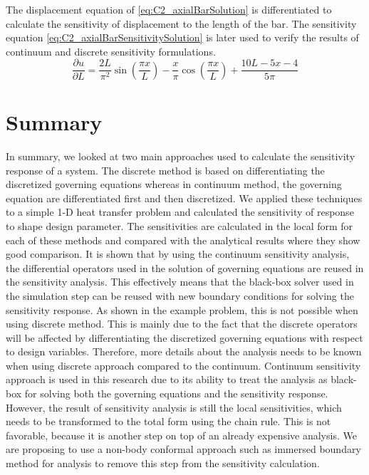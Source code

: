 %
The displacement equation of \eqref{eq:C2_axialBarSolution} is differentiated to calculate the sensitivity of displacement to the length of the bar. The sensitivity equation \eqref{eq:C2_axialBarSensitivitySolution} is later used to verify the results of continuum and discrete sensitivity formulations.
%
\begin{equation}\label{eq:C2_axialBarSensitivitySolution}
    \dfrac{\partial u}{\partial L} = 
    \dfrac{2L}{\pi^2} \sin \left( \frac{\pi x}{L} \right) - 
    \dfrac{x}{\pi} \cos \left( \frac{\pi x}{L} \right) + 
    \dfrac{10L - 5x - 4}{5 \pi}
\end{equation}
%


\section{Summary}
In summary, we looked at two main approaches used to calculate the sensitivity response of a system. The discrete method is based on differentiating the discretized governing equations whereas in continuum method, the governing equation are differentiated first and then discretized. We applied these techniques to a simple 1-D heat transfer problem and calculated the sensitivity of response to shape design parameter. The sensitivities are calculated in the local form for each of these methods and compared with the analytical results where they show good comparison. It is shown that by using the continuum sensitivity analysis, the differential operators used in the solution of governing equations are reused in the sensitivity analysis. This effectively means that the black-box solver used in the simulation step can be reused with new boundary conditions for solving the sensitivity response. As shown in the example problem, this is not possible when using discrete method. This is mainly due to the fact that the discrete operators will be affected by differentiating the discretized governing equations with respect to design variables. Therefore, more details about the analysis needs to be known when using discrete approach compared to the continuum. Continuum sensitivity approach is used in this research due to its ability to treat the analysis as black-box for solving both the governing equations and the sensitivity response. However, the result of sensitivity analysis is still the local sensitivities, which needs to be transformed to the total form using the chain rule. This is not favorable, because it is another step on top of an already expensive analysis. We are proposing to use a non-body conformal approach such as immersed boundary method for analysis to remove this step from the sensitivity calculation.